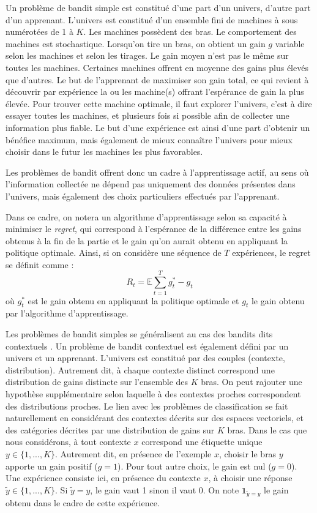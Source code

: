 \documentclass[twocolumn]{article}
\begin{document}
Un problème de bandit simple est constitué d'une part d'un univers,  d'autre part d'un apprenant. L'univers est constitué d'un ensemble fini de machines à sous numérotées de 1 à $K$. Les machines possèdent des bras. Le comportement des machines est stochastique. Lorsqu'on tire un bras, on obtient un gain $g$ variable selon les machines et selon les tirages. Le gain moyen n'est pas le même sur toutes les machines. Certaines machines offrent en moyenne des gains plus élevés que d'autres. Le but de l'apprenant de maximiser son gain total, ce qui revient à découvrir par expérience la ou les machine(s) offrant l'espérance de gain la plus élevée. Pour trouver cette machine optimale, il faut explorer l'univers, c'est à dire essayer toutes les machines, et plusieurs fois si possible afin de collecter une information plus fiable. Le but d'une expérience est ainsi d'une part d'obtenir un bénéfice maximum, mais également de mieux connaître l'univers pour mieux choisir dans le futur les machines les plus favorables. 

Les problèmes de bandit offrent donc un cadre à l'apprentissage actif, au sens où l'information collectée ne dépend pas uniquement des données présentes dans l'univers, mais également des choix particuliers effectués par l'apprenant. 

Dans ce cadre, on notera un algorithme d'apprentissage selon sa capacité à minimiser le \textit{regret}, qui correspond à l'espérance de la différence entre les gains obtenus à la fin de la partie et le gain qu'on aurait obtenu en appliquant la politique optimale. 
Ainsi, si on considère une séquence de $T$ expériences, le regret se définit comme :
$$R_t = \mathbb{E} \sum_{t=1}^T g_t^* - g_t$$
où $g_t^*$ est le gain obtenu en appliquant la politique optimale et $g_t$ le gain obtenu par l'algorithme d'apprentissage.

Les problèmes de bandit simples se généralisent au cas des bandits dits contextuels \cite{langford2008epoch}. Un problème de bandit contextuel est également défini par un univers et un apprenant. L'univers est constitué par des couples (contexte, distribution). Autrement dit, à chaque contexte distinct correspond une distribution de gains distincte sur l'ensemble des $K$ bras. On peut rajouter une hypothèse supplémentaire selon laquelle à des contextes proches correspondent des distributions proches. Le lien avec les problèmes de classification se fait naturellement en considérant des contextes décrits sur des espaces vectoriels, et des catégories décrites par une distribution de gains sur $K$ bras. Dans le cas que nous considérons, à tout contexte $x$ correspond une étiquette unique $y \in \{1,...,K\}$. Autrement dit, en présence de l'exemple $x$, choisir le bras $y$ apporte un gain positif ($g=1$). Pour tout autre choix, le gain est nul ($g=0$). Une expérience consiste ici, en présence du contexte $x$, à choisir une réponse $\tilde{y} \in \{1,...,K\}$. Si $\tilde{y} = y$, le gain vaut 1 sinon il vaut 0. On note $\mathbf{1}_{\tilde{y} = y}$ le gain obtenu dans le cadre de cette expérience. 
\end{document}
